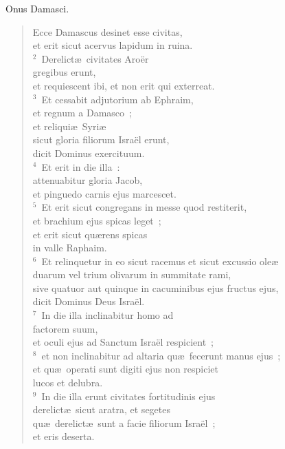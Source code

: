 \lettrine[lines=3,image=true,loversize=0.05,lraise=-0.03]{O}{}nus Damasci. \begin{flushleft}\begin{verse}\vspace{6pt}Ecce Damascus desinet esse civitas,\\ et erit sicut acervus lapidum in ruina.\\
${}^{2}$~Derelict\ae\ civitates Aro\"er\\ gregibus erunt,\\ et requiescent ibi, et non erit qui exterreat.\\
${}^{3}$~Et cessabit adjutorium ab Ephraim,\\ et regnum a Damasco~;\\ et reliqui\ae\ Syri\ae \\ sicut gloria filiorum Isra\"el erunt,\\ dicit Dominus exercituum.\\
${}^{4}$~Et erit in die illa~:\\ attenuabitur gloria Jacob,\\ et pinguedo carnis ejus marcescet.\\
${}^{5}$~Et erit sicut congregans in messe quod restiterit,\\ et brachium ejus spicas leget~;\\ et erit sicut qu\ae rens spicas\\ in valle Raphaim.\\
${}^{6}$~Et relinquetur in eo sicut racemus et sicut excussio ole\ae \\ duarum vel trium olivarum in summitate rami,\\ sive quatuor aut quinque in cacuminibus ejus fructus ejus,\\ dicit Dominus Deus Isra\"el.\\
${}^{7}$~In die illa inclinabitur homo ad\\ factorem suum,\\ et oculi ejus ad Sanctum Isra\"el respicient~;\\
${}^{8}$~et non inclinabitur ad altaria qu\ae\ fecerunt manus ejus~;\\ et qu\ae\ operati sunt digiti ejus non respiciet\\ lucos et delubra.\\
${}^{9}$~In die illa erunt civitates fortitudinis ejus\\ derelict\ae\ sicut aratra, et segetes\\ qu\ae\ derelict\ae\ sunt a facie filiorum Isra\"el~;\\ et eris deserta.\\

\end{verse}
\end{flushleft}
